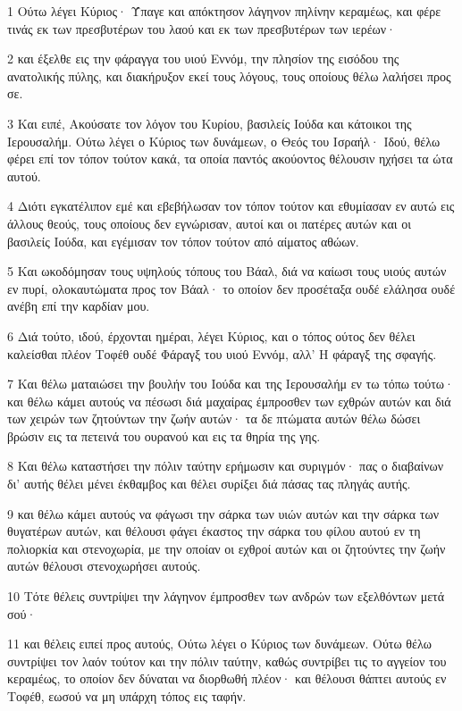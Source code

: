 \par 1 Ούτω λέγει Κύριος· Ύπαγε και απόκτησον λάγηνον πηλίνην κεραμέως, και φέρε τινάς εκ των πρεσβυτέρων του λαού και εκ των πρεσβυτέρων των ιερέων·
\par 2 και έξελθε εις την φάραγγα του υιού Εννόμ, την πλησίον της εισόδου της ανατολικής πύλης, και διακήρυξον εκεί τους λόγους, τους οποίους θέλω λαλήσει προς σε.
\par 3 Και ειπέ, Ακούσατε τον λόγον του Κυρίου, βασιλείς Ιούδα και κάτοικοι της Ιερουσαλήμ. Ούτω λέγει ο Κύριος των δυνάμεων, ο Θεός του Ισραήλ· Ιδού, θέλω φέρει επί τον τόπον τούτον κακά, τα οποία παντός ακούοντος θέλουσιν ηχήσει τα ώτα αυτού.
\par 4 Διότι εγκατέλιπον εμέ και εβεβήλωσαν τον τόπον τούτον και εθυμίασαν εν αυτώ εις άλλους θεούς, τους οποίους δεν εγνώρισαν, αυτοί και οι πατέρες αυτών και οι βασιλείς Ιούδα, και εγέμισαν τον τόπον τούτον από αίματος αθώων.
\par 5 Και ωκοδόμησαν τους υψηλούς τόπους του Βάαλ, διά να καίωσι τους υιούς αυτών εν πυρί, ολοκαυτώματα προς τον Βάαλ· το οποίον δεν προσέταξα ουδέ ελάλησα ουδέ ανέβη επί την καρδίαν μου.
\par 6 Διά τούτο, ιδού, έρχονται ημέραι, λέγει Κύριος, και ο τόπος ούτος δεν θέλει καλείσθαι πλέον Τοφέθ ουδέ Φάραγξ του υιού Εννόμ, αλλ' Η φάραγξ της σφαγής.
\par 7 Και θέλω ματαιώσει την βουλήν του Ιούδα και της Ιερουσαλήμ εν τω τόπω τούτω· και θέλω κάμει αυτούς να πέσωσι διά μαχαίρας έμπροσθεν των εχθρών αυτών και διά των χειρών των ζητούντων την ζωήν αυτών· τα δε πτώματα αυτών θέλω δώσει βρώσιν εις τα πετεινά του ουρανού και εις τα θηρία της γης.
\par 8 Και θέλω καταστήσει την πόλιν ταύτην ερήμωσιν και συριγμόν· πας ο διαβαίνων δι' αυτής θέλει μένει έκθαμβος και θέλει συρίξει διά πάσας τας πληγάς αυτής.
\par 9 και θέλω κάμει αυτούς να φάγωσι την σάρκα των υιών αυτών και την σάρκα των θυγατέρων αυτών, και θέλουσι φάγει έκαστος την σάρκα του φίλου αυτού εν τη πολιορκία και στενοχωρία, με την οποίαν οι εχθροί αυτών και οι ζητούντες την ζωήν αυτών θέλουσι στενοχωρήσει αυτούς.
\par 10 Τότε θέλεις συντρίψει την λάγηνον έμπροσθεν των ανδρών των εξελθόντων μετά σού·
\par 11 και θέλεις ειπεί προς αυτούς, Ούτω λέγει ο Κύριος των δυνάμεων. Ούτω θέλω συντρίψει τον λαόν τούτον και την πόλιν ταύτην, καθώς συντρίβει τις το αγγείον του κεραμέως, το οποίον δεν δύναται να διορθωθή πλέον· και θέλουσι θάπτει αυτούς εν Τοφέθ, εωσού να μη υπάρχη τόπος εις ταφήν.
